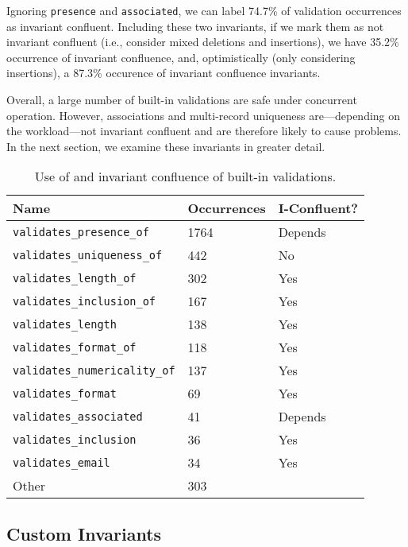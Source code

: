 Ignoring \texttt{presence} and \texttt{associated}, we can
label 74.7\% of validation occurrences as invariant
confluent. Including these two invariants, if we mark them as not
invariant confluent (i.e., consider mixed deletions and insertions),
we have 35.2\% occurrence of invariant confluence, and, optimistically
(only considering insertions), a 87.3\% occurence of invariant
confluence invariants.

Overall, a large number of built-in validations are safe under
concurrent operation. However, associations and multi-record
uniqueness are---depending on the workload---not invariant confluent
and are therefore likely to cause problems. In the next section, we
examine these invariants in greater detail.

\begin{table}
\begin{center}
\small
\begin{tabular}{|l l l |}
\hline
Name & Occurrences & I-Confluent?\\\hline
\texttt{validates\_presence\_of} & 1764 & Depends\\
\texttt{validates\_uniqueness\_of} & 442 & No \\
\texttt{validates\_length\_of} & 302 & Yes \\
\texttt{validates\_inclusion\_of} & 167 & Yes\\
\texttt{validates\_length} & 138 & Yes \\
\texttt{validates\_format\_of} & 118 & Yes\\
\texttt{validates\_numericality\_of} & 137 & Yes \\
\texttt{validates\_format} & 69 & Yes \\
\texttt{validates\_associated} & 41 & Depends\\
\texttt{validates\_inclusion} & 36 & Yes \\
\texttt{validates\_email} & 34 & Yes \\
Other & 303 & \\\hline
\end{tabular}
\end{center}\vspace{-1em}
\caption{Use of and invariant confluence of built-in validations.}
\label{table:builtins}
\end{table}

\subsection{Custom Invariants}


